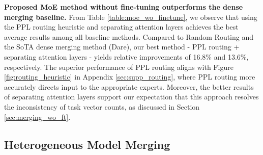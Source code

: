 
\noindent \textbf{Proposed MoE method without fine-tuning outperforms the dense merging baseline.} \quad From Table \ref{table:moe_wo_finetune}, we observe that using the PPL routing heuristic and separating attention layers achieves the best average results among all baseline methods. Compared to Random Routing and the SoTA dense merging method (Dare), our best method - PPL routing + separating attention layers - yields relative improvements of 16.8\% and 13.6\%, respectively. The superior performance of PPL routing aligns with Figure \ref{fig:routing_heuristic} in Appendix \ref{sec:supp_routing}, where PPL routing more accurately directs input to the appropriate experts. 
Moreover, the better results of separating attention layers support our expectation that this approach resolves the inconsistency of task vector counts, as discussed in Section \ref{sec:merging_wo_ft}.


\subsection{Heterogeneous Model Merging}


